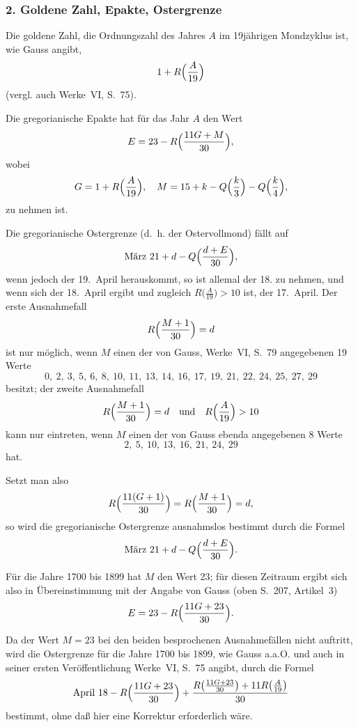 \documentclass[12pt,a4paper]{article}
\theoremstyle{plain}
\theoremstyle{definition}
\theoremstyle{remark}
\begin{document}
\newpage

\subsubsection*{2. Goldene Zahl, Epakte, Ostergrenze}

Die goldene Zahl, die Ordnungszahl des Jahres $A$ im 19jährigen Mondzyklus ist, wie Gauss angibt,
\[
1 + R\Bigl(\frac{A}{19}\Bigr)
\]
(vergl. auch Werke~VI, S.~75).

Die gregorianische Epakte hat für das Jahr $A$ den Wert
\[
E = 23 - R\Bigl(\frac{11G + M}{30}\Bigr),
\]
wobei
\[
G = 1 + R\Bigl(\frac{A}{19}\Bigr), \quad M = 15 + k - Q\Bigl(\frac{k}{3}\Bigr) - Q\Bigl(\frac{k}{4}\Bigr),
\]
zu nehmen ist.

Die gregorianische Ostergrenze (d.~h. der Ostervollmond) fällt auf
\[
\text{März } 21 + d - Q\Bigl(\frac{d + E}{30}\Bigr),
\]
 wenn jedoch der 19.~April herauskommt, so ist allemal der 18. zu nehmen, und wenn sich der 18.~April ergibt und zugleich $R\bigl(\frac{A}{19}\bigr) > 10$ ist, der 17.~April. Der erste Ausnahmefall
\[
R\Bigl(\frac{M + 1}{30}\Bigr) = d
\]
ist nur möglich, wenn $M$ einen der von Gauss, Werke~VI, S.~79 angegebenen 19 Werte
\[0,\ 2,\ 3,\ 5,\ 6,\ 8,\ 10,\ 11,\ 13,\ 14,\ 16,\ 17,\ 19,\ 21,\ 22,\ 24,\ 25,\ 27,\ 29\]
besitzt; der zweite Ausnahmefall
\[
R\Bigl(\frac{M + 1}{30}\Bigr) = d \quad \text{und} \quad R\Bigl(\frac{A}{19}\Bigr) > 10
\]
kann nur eintreten, wenn $M$ einen der von Gauss ebenda angegebenen 8 Werte
\[2,\ 5,\ 10,\ 13,\ 16,\ 21,\ 24,\ 29\]
hat.

Setzt man also
\[
R\Bigl(\frac{11(G + 1)}{30}\Bigr) = R\Bigl(\frac{M + 1}{30}\Bigr) = d,
\]
so wird die gregorianische Ostergrenze ausnahmslos bestimmt durch die Formel
\[
\text{März } 21 + d - Q\Bigl(\frac{d + E}{30}\Bigr).
\]

Für die Jahre 1700 bis 1899 hat $M$ den Wert 23; für diesen Zeitraum ergibt sich also in Übereinstimmung mit der Angabe von Gauss (oben S.~207, Artikel~3)
\[
E = 23 - R\Bigl(\frac{11G + 23}{30}\Bigr).
\]

Da der Wert $M = 23$ bei den beiden besprochenen Ausnahmefällen nicht auftritt, wird die Ostergrenze für die Jahre 1700 bis 1899, wie Gauss a.a.O. und auch in seiner ersten Veröffentlichung Werke~VI, S.~75 angibt, durch die Formel
\[
\text{April } 18 - R\Bigl(\frac{11G + 23}{30}\Bigr) + \frac{R\bigl(\frac{11G + 23}{30}\bigr) + 11R\bigl(\frac{A}{19}\bigr)}{30}
\]
bestimmt, ohne daß hier eine Korrektur erforderlich wäre.
\end{document}
